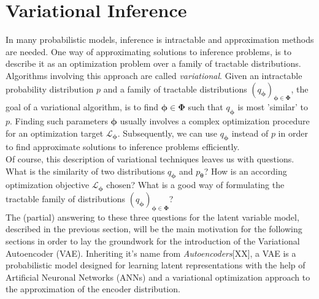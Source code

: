 \documentclass[12pt]{report}
\theoremstyle{definition}
\begin{document}
\section{Variational Inference}
In many probabilistic models, inference is intractable and approximation methods are needed. One way of approximating solutions to inference problems, is to describe it as an optimization problem over a family of tractable distributions. Algorithms involving this approach are called \emph{variational}.
Given an intractable probability distribution $p$ and a family of tractable distributions $(q_{\pmb{\phi}})_{\pmb{\phi} \in \pmb{\Phi}}$, the goal of a variational algorithm, is to find $\pmb{\phi} \in \pmb{\Phi}$ such that $q_{\pmb{\phi}}$ is most 'similar' to $p$. Finding such parameters $\pmb{\phi}$ usually involves a complex optimization procedure for an optimization target $\mathcal{L}_{\pmb{\phi}}$. Subsequently, we can use $q_{\pmb{\phi}}$ instead of $p$ in order to find approximate solutions to inference problems efficiently.\\
Of course, this description of variational techniques leaves us with questions. What is the similarity of two distributions $q_{\pmb{\phi}}$ and $p_{\pmb{\theta}}$? How is an according optimization objective $\mathcal{L}_{\pmb{\phi}}$ chosen? What is a good way of formulating the tractable family of distributions $(q_{\pmb{\phi}})_{\pmb{\phi} \in \pmb{\Phi}}$? \\
The (partial) answering to these three questions for the latent variable model, described in the previous section, will be the main motivation for the following sections in order to lay the groundwork for the introduction of the Variational Autoencoder (VAE). Inheriting it's name from \emph{Autoencoders}[XX], a VAE is a probabilistic model designed for learning latent representations with the help of Artificial Neuronal Networks (ANNs) and a variational optimization approach to the approximation of the encoder distribution.
\end{document}
